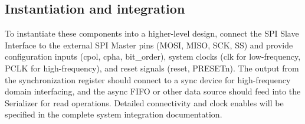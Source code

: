 \subsection{Instantiation and integration}

To instantiate these components into a higher-level design, connect the SPI Slave Interface to the external SPI Master pins (MOSI, MISO, SCK, SS) and provide configuration inputs (cpol, cpha, bit\_order), system clocks (clk for low-frequency, PCLK for high-frequency), and reset signals (reset, PRESETn). The output from the synchronization register should connect to a sync device for high-frequency domain interfacing, and the async FIFO or other data source should feed into the Serializer for read operations. Detailed connectivity and clock enables will be specified in the complete system integration documentation.
